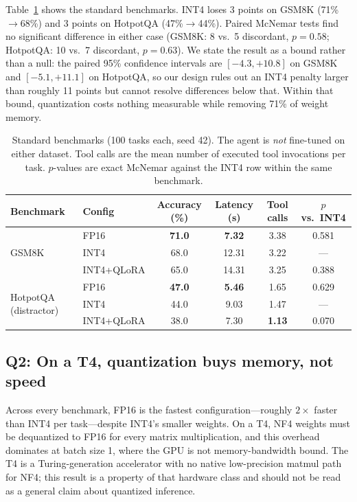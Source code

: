 \documentclass{article}
\begin{document}
Table~\ref{tab:standard} shows the standard benchmarks. INT4 loses 3
points on GSM8K (71\%$\rightarrow$68\%) and 3 points on HotpotQA
(47\%$\rightarrow$44\%). Paired McNemar tests find no significant
difference in either case (GSM8K: 8 vs.\ 5 discordant, $p{=}0.58$;
HotpotQA: 10 vs.\ 7 discordant, $p{=}0.63$). We state the result as a
bound rather than a null: the paired 95\% confidence intervals are
$[-4.3, +10.8]$ on GSM8K and $[-5.1, +11.1]$ on HotpotQA, so our design
rules out an INT4 penalty larger than roughly 11 points but cannot
resolve differences below that. Within that bound, quantization costs
nothing measurable while removing 71\% of weight memory.

\begin{table}[t]
\centering
\caption{Standard benchmarks (100 tasks each, seed 42). The agent is
\emph{not} fine-tuned on either dataset. Tool calls are the mean number
of executed tool invocations per task. $p$-values are exact McNemar
against the INT4 row within the same benchmark.}
\label{tab:standard}
\small
\begin{tabular}{llcccc}
\toprule
Benchmark & Config & Accuracy (\%) & Latency (s) & Tool calls & $p$ vs.\ INT4 \\
\midrule
\multirow{3}{*}{GSM8K}
 & FP16        & \textbf{71.0} & \textbf{7.32} & 3.38 & 0.581 \\
 & INT4        & 68.0          & 12.31         & 3.22 & --- \\
 & INT4+QLoRA  & 65.0          & 14.31         & 3.25 & 0.388 \\
\midrule
\multirow{3}{*}{HotpotQA (distractor)}
 & FP16        & \textbf{47.0} & \textbf{5.46} & 1.65 & 0.629 \\
 & INT4        & 44.0          & 9.03          & 1.47 & --- \\
 & INT4+QLoRA  & 38.0          & 7.30          & \textbf{1.13} & 0.070 \\
\bottomrule
\end{tabular}
\end{table}

\subsection{Q2: On a T4, quantization buys memory, not speed}

Across every benchmark, FP16 is the fastest configuration---roughly
$2\times$ faster than INT4 per task---despite INT4's smaller weights. On a T4, NF4
weights must be dequantized to FP16 for every matrix multiplication, and
this overhead dominates at batch size 1, where the GPU is not
memory-bandwidth bound. The T4 is a Turing-generation accelerator with no
native low-precision matmul path for NF4; this result is a property of
that hardware class and should not be read as a general claim about
quantized inference.
\end{document}

